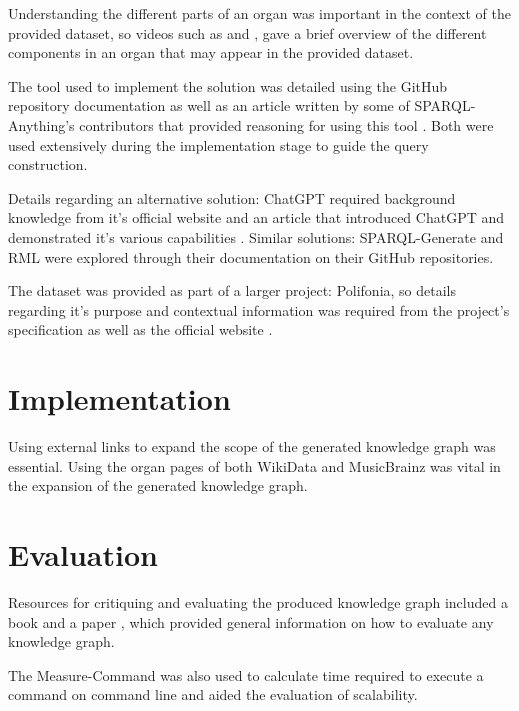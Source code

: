 Understanding the different parts of an organ was important in the context of the provided dataset, so videos such as \cite{organvideo} and \cite{organvideo1}, gave a brief overview of the different components in an organ that may appear in the provided dataset. 

The tool used to implement the solution was detailed using the GitHub repository documentation \cite{sparqlanythinggithub} as well as an article written by some of SPARQL-Anything's contributors that provided reasoning for using this tool \cite{sparqlanything}. Both were used extensively during the implementation stage to guide the query construction. 

Details regarding an alternative solution: ChatGPT required background knowledge from it's official website \cite{chatgptwebsite} and an article that introduced ChatGPT and demonstrated it's various capabilities \cite{chatgpt}. Similar solutions: SPARQL-Generate \cite{sparqlgenerate} and RML \cite{rml} were explored through their documentation on their GitHub repositories.

The dataset was provided as part of a larger project: Polifonia, so details regarding it's purpose and contextual information was required from the project's specification \cite{polifoniaproject} as well as the official website \cite{polifonia}. 

\section{Implementation}
\hspace{0.5cm} Using external links to expand the scope of the generated knowledge graph was essential. Using the organ pages of both WikiData \cite{organwikidata} and MusicBrainz \cite{organmusicbrainz} was vital in the expansion of the generated knowledge graph. 

\section{Evaluation}
\hspace{0.5cm} Resources for critiquing and evaluating the produced knowledge graph included a book \cite{knowledgegraphevaulationbook} and a paper \cite{evaluationpaper}, which provided general information on how to evaluate any knowledge graph. 

The Measure-Command \cite{measurecommand} was also used to calculate time required to execute a command on command line and aided the evaluation of scalability. 

